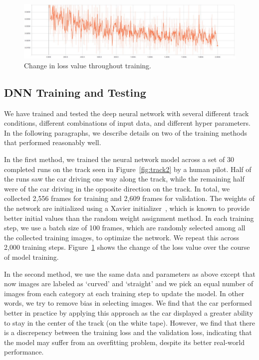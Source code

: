 \begin{figure}[t]
  \centering
  \includegraphics[width=.9\textwidth]{figs/TrainingLoss}
  \caption{Change in loss value throughout training.}
  \label{fig:modelloss}
\end{figure}

\subsection{DNN Training and Testing}
We have trained and tested the deep neural network with several
different track conditions, different combinations of input
data, and different hyper parameters. In the following paragraphs, we 
describe details on two of the training methods that performed 
reasonably well.

In the first method, we trained the neural network model across a set 
of 30 completed runs on the track seen in Figure~\ref{fig:track2} by a
human pilot. Half of the runs saw the car driving one way along the
track, while the remaining half were of the car driving in the
opposite direction on the track.
In total, we collected 2,556 frames for training and 2,609 
frames for validation.
The weights of the network are initialized using a Xavier
initializer~\cite{Glorot2010}, which is known to provide better
initial values than the random weight assignment method.
In each training step, we use a batch
size of 100 frames, which are randomly selected among all the
collected training images, to optimize the network.
We repeat this across 2,000 training steps.
Figure~\ref{fig:modelloss} shows the change of the loss value over the
course of model training.

In the second method, we use the same data and parameters as  above 
except that now images are labeled as `curved' and `straight' and we pick an
equal number of images from each category at each training step to
update the model. In other words, we try to remove bias in selecting
images. We find that the car performed better in practice by applying
this approach as the car displayed a greater ability to stay in the
center of the track (on the white tape).
However, we find that there is a discrepency between the training
loss and the validation loss, indicating that the model may suffer
from an overfitting problem, despite its better real-world
performance.

